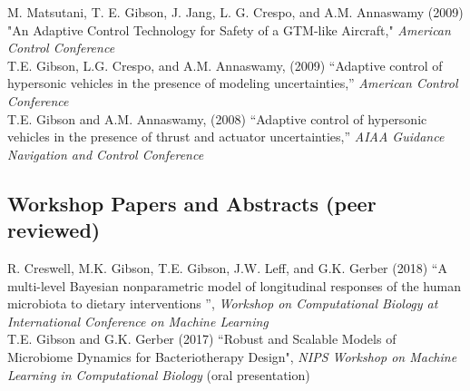 \documentclass[10pt, letterpaper]{article}
\newcommand{\years}[1]{\marginnote{\scriptsize #1}}
\begin{document}
\years{2009} M. Matsutani, T. E. Gibson, J. Jang, L. G. Crespo, and A.M. Annaswamy (2009) "An Adaptive Control Technology for Safety of a GTM-like Aircraft," {\em American Control Conference} \\[0.1cm]
\years{2009} T.E. Gibson, L.G. Crespo, and A.M. Annaswamy, (2009) ``Adaptive control of hypersonic vehicles in the presence of modeling uncertainties,'' {\em American Control Conference}\\[0.1cm]
\years{2008} T.E. Gibson and A.M. Annaswamy, (2008) ``Adaptive control of hypersonic vehicles in the presence of thrust and actuator uncertainties,'' {\em AIAA Guidance Navigation and Control Conference}

\subsection*{Workshop Papers and Abstracts (peer reviewed)}
\years{2018} R. Creswell, M.K. Gibson, T.E. Gibson, J.W. Leff, and G.K. Gerber  (2018) ``A multi-level Bayesian nonparametric model of longitudinal responses of the human microbiota to dietary interventions '', {\em Workshop on Computational Biology at International Conference on Machine Learning} \\[0.1cm]
\years{2017} T.E. Gibson and G.K. Gerber (2017) “Robust and Scalable Models of Microbiome Dynamics for Bacteriotherapy Design", {\em   NIPS Workshop on Machine Learning in Computational Biology} (oral presentation) 
\end{document}
